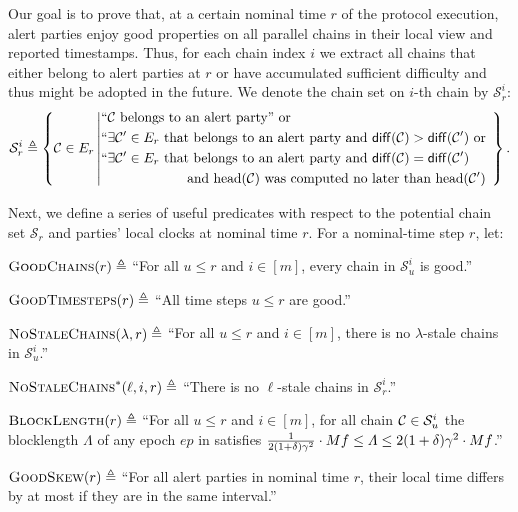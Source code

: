 Our goal is to prove that, at a certain nominal time $r$ of the protocol execution, alert parties enjoy good properties on all parallel chains in their local view and reported timestamps.
%
Thus, for each chain index $i$ we extract all chains that either belong to alert parties at $r$ or have accumulated sufficient difficulty and thus might be adopted in the future.
%
We denote the chain set on $i$-th chain by $\mathcal{S}^i_r$:
%
\begin{equation*}
    \mathcal{S}^i_r \triangleq
    \left\{
    \chain \in E_r
    \left|
    \begin{aligned}
         & ``\chain \text{ belongs to an alert party'' or}                                                                           \\
         & ``\exists \chain'\in E_r \text{ that belongs to an alert party and } \chainDiff{\chain} > \chainDiff{\chain'} \text{ or } \\
         & ``\exists \chain'\in E_r \text{ that belongs to an alert party and } \chainDiff{\chain} = \chainDiff{\chain'}             \\
         & \qquad \qquad \qquad \text{ and \chainHead{\chain} was computed no later than \chainHead{\chain'}}
    \end{aligned}
    \right.
    \right\}.
\end{equation*}


Next, we define a series of useful predicates with respect to the potential chain set $\mathcal{S}_r$ and parties' local clocks at nominal time $r$.
%
For a nominal-time step $r$, let:
%
\begin{cccItemize}[noitemsep]
    \item $\textsc{GoodChains}(r) \triangleq$ ``For all $u \le r$ and $i \in [m]$, every chain in $\mathcal{S}^i_u$ is good.''

    \item $\textsc{GoodTimesteps}(r) \triangleq$ ``All time steps $u \le r$ are good.''

    \item $\textsc{NoStaleChains}(\lambda, r) \triangleq$ ``For all $u \le r$ and $i \in [m]$, there is no $\lambda$-stale chains in $\mathcal{S}^i_u$.''

    \item $\textsc{NoStaleChains}^\ast(\ell, i, r) \triangleq$ ``There is no $\ell$-stale chains in $\mathcal{S}^i_r$.''

    \item $\textsc{BlockLength}(r) \triangleq$ ``For all $u \le r$ and $i \in [m]$, for all chain $\mathcal{C} \in \mathcal{S}^i_u$ the blocklength $\varLambda$ of any epoch $ep$ in \chain satisfies $\frac{1}{2(1 + \delta) \gamma^2} \cdot M f \le \varLambda \le 2(1 + \delta) \gamma^2 \cdot M f$.''

    \item $\textsc{GoodSkew}(r) \triangleq$ ``For all alert parties in nominal time $r$, their local time differs by at most \maxSkew if they are in the same interval.''
\end{cccItemize}

